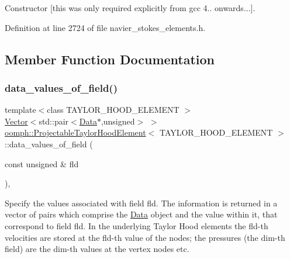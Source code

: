 Constructor \mbox{[}this was only required explicitly from gcc 4.. onwards...\mbox{]}. 



Definition at line 2724 of file navier\+\_\+stokes\+\_\+elements.\+h.



\subsection{Member Function Documentation}
\mbox{\label{classoomph_1_1ProjectableTaylorHoodElement_a6def621e7df117d5e803e8e47f53c352}} 
\subsubsection{\texorpdfstring{data\+\_\+values\+\_\+of\+\_\+field()}{data\_values\_of\_field()}}
{\footnotesize\ttfamily template$<$class T\+A\+Y\+L\+O\+R\+\_\+\+H\+O\+O\+D\+\_\+\+E\+L\+E\+M\+E\+NT $>$ \\
\hyperlink{classoomph_1_1Vector}{Vector}$<$std\+::pair$<$\hyperlink{classoomph_1_1Data}{Data}$\ast$,unsigned$>$ $>$ \hyperlink{classoomph_1_1ProjectableTaylorHoodElement}{oomph\+::\+Projectable\+Taylor\+Hood\+Element}$<$ T\+A\+Y\+L\+O\+R\+\_\+\+H\+O\+O\+D\+\_\+\+E\+L\+E\+M\+E\+NT $>$\+::data\+\_\+values\+\_\+of\+\_\+field (\begin{DoxyParamCaption}\item[{const unsigned \&}]{fld }\end{DoxyParamCaption})\hspace{0.3cm}{\ttfamily [inline]}, {\ttfamily [virtual]}}



Specify the values associated with field fld. The information is returned in a vector of pairs which comprise the \hyperlink{classoomph_1_1Data}{Data} object and the value within it, that correspond to field fld. In the underlying Taylor Hood elements the fld-\/th velocities are stored at the fld-\/th value of the nodes; the pressures (the dim-\/th field) are the dim-\/th values at the vertex nodes etc. 



